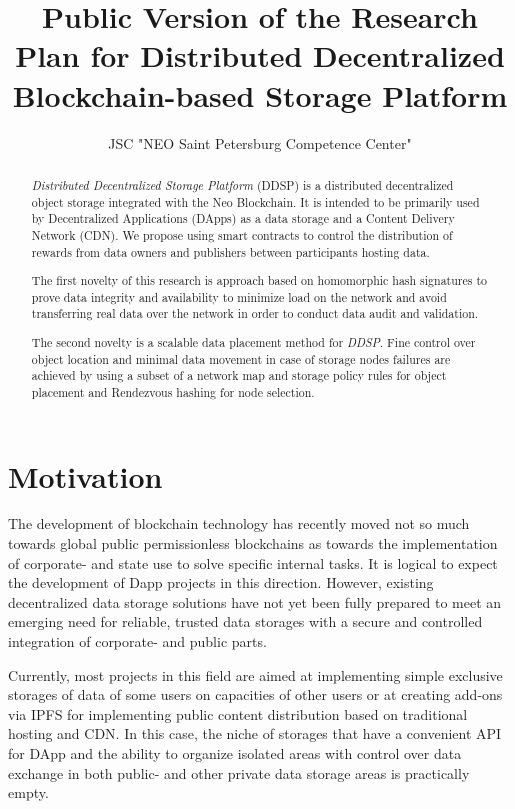 \documentclass[a4paper, 11pt]{article}
\author[]{JSC "NEO Saint Petersburg Competence Center"}
\title{Public Version of the Research Plan for Distributed Decentralized Blockchain-based Storage Platform}
\begin{document}
\maketitle

\begin{abstract}

\textit{Distributed Decentralized Storage Platform} (DDSP) is a distributed 
decentralized object storage integrated with the Neo Blockchain. It is intended 
to be primarily used by Decentralized Applications (DApps) as a data storage 
and a Content Delivery Network (CDN). We propose using smart contracts to 
control the distribution of rewards from data owners and publishers between 
participants hosting data.

The first novelty of this research is approach based on homomorphic 
hash signatures to prove data integrity and availability to minimize 
load on the network and avoid transferring real data over the network in order to 
conduct data audit and validation. 

The second novelty is a scalable data placement method for \textit{DDSP}. Fine control 
over object location and minimal data movement in case of storage nodes 
failures are achieved by using a subset of a network map and storage 
policy rules for object placement and Rendezvous hashing for node selection.

\end{abstract}

\tableofcontents

\setlength{\parskip}{0.2cm}

\section{Motivation}

The development of blockchain technology has recently moved not so much
towards global public permissionless blockchains as towards the implementation
of corporate- and state use to solve specific internal tasks. It is logical
to expect the development of Dapp projects in this
direction. However, existing decentralized data storage solutions have not yet
been fully prepared to meet an emerging need for reliable, trusted data
storages with a secure and controlled integration of corporate- and public parts.

Currently, most projects in this field are aimed at implementing simple exclusive
storages of data of some users on capacities of other users or at creating
add-ons via IPFS for implementing public content distribution based on
traditional hosting and CDN. In this case, the niche of storages that have a
convenient API for DApp and the ability to organize isolated areas with control
over data exchange in both public- and other private data storage areas
is practically empty.
\end{document}
